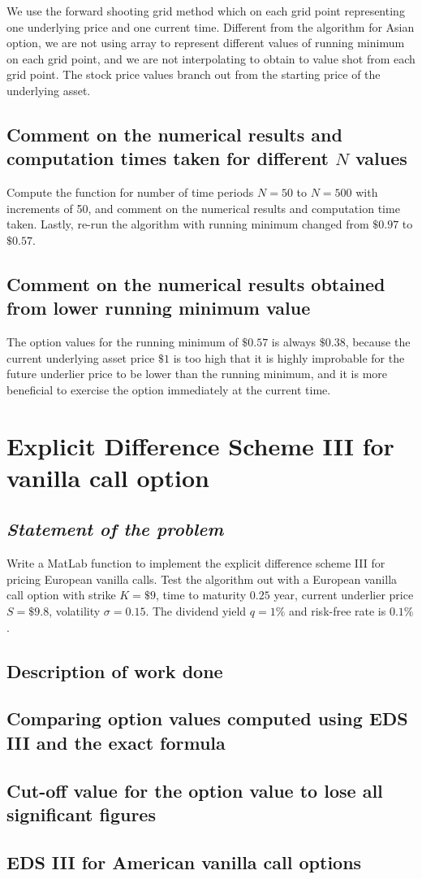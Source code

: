 We use the forward shooting grid method which on each grid point representing one underlying price and one current time. Different from the algorithm for Asian option, we are not using array to represent different values of running minimum on each grid point, and we are not interpolating to obtain to value shot from each grid point. The stock price values branch out from the starting price of the underlying asset.

\subsection{Comment on the numerical results and computation times taken for different $N$ values}
Compute the function for number of time periods $N = 50$ to $N = 500$ with increments of 50, and comment on the numerical results and computation time taken. Lastly, re-run the algorithm with running minimum changed from $\$0.97$ to $\$0.57$.

\subsection{Comment on the numerical results obtained from lower running minimum value}
The option values for the running minimum of $\$0.57$ is always $\$0.38$, because the current underlying asset price $\$1$ is too high that it is highly improbable for the future underlier price to be lower than the running minimum, and it is more beneficial to exercise the option immediately at the current time.

\section{Explicit Difference Scheme III for vanilla call option}
\subsection*{\emph{Statement of the problem}}
Write a MatLab function to implement the explicit difference scheme III for pricing European vanilla calls. Test the algorithm out with a European vanilla call option with strike $K = \$9$, time to maturity $0.25$ year, current underlier price $S = \$9.8$, volatility $\sigma=0.15$. The dividend yield $q = 1\%$ and risk-free rate is $0.1\%$.

\subsection{Description of work done}

\subsection{Comparing option values computed using EDS III and the exact formula}

\subsection{Cut-off value for the option value to lose all significant figures}

\subsection{EDS III for American vanilla call options}

